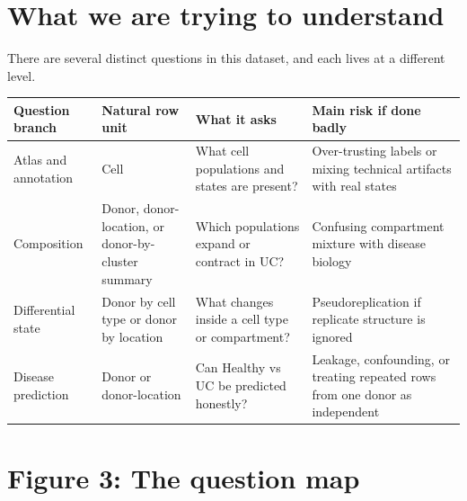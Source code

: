 \documentclass[11pt]{article}
\begin{document}
\section*{What we are trying to understand}

There are several distinct questions in this dataset, and each lives at a
different level.

\begin{center}
\begin{tabular}{>{\raggedright\arraybackslash}p{2.6cm} >{\raggedright\arraybackslash}p{3.0cm} >{\raggedright\arraybackslash}p{4.0cm} >{\raggedright\arraybackslash}p{4.0cm}}
\toprule
\textbf{Question branch} & \textbf{Natural row unit} & \textbf{What it asks} & \textbf{Main risk if done badly} \\
\midrule
Atlas and annotation & Cell & What cell populations and states are present? & Over-trusting labels or mixing technical artifacts with real states \\
Composition & Donor, donor-location, or donor-by-cluster summary & Which populations expand or contract in UC? & Confusing compartment mixture with disease biology \\
Differential state & Donor by cell type or donor by location & What changes inside a cell type or compartment? & Pseudoreplication if replicate structure is ignored \\
Disease prediction & Donor or donor-location & Can Healthy vs UC be predicted honestly? & Leakage, confounding, or treating repeated rows from one donor as independent \\
\bottomrule
\end{tabular}
\end{center}

\section*{Figure 3: The question map}
\end{document}
